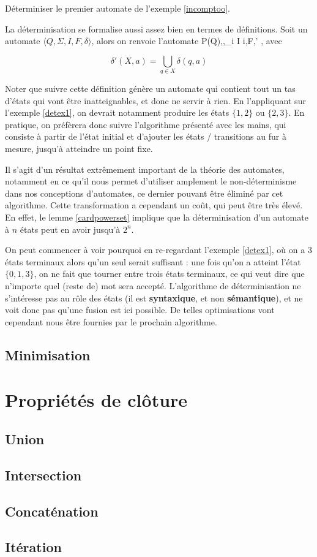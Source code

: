\begin{exercice}
Déterminiser le premier automate de l'exemple \ref{incomptoo}.
\end{exercice}

La déterminisation se formalise aussi assez bien en termes de définitions. Soit un automate $\big \langle Q,\Sigma,I,F,\delta \big \rangle$, alors on renvoie l'automate \big \langle P(Q),\Sigma,\bigcup_{i \in I} i,F,\delta' \big \rangle, avec

\[
\delta'(X,a) = \bigcup_{q \in X} \delta(q,a)
\]

Noter que suivre cette définition génère un automate qui contient tout un tas d'états qui vont être inatteignables, et donc ne servir à rien. En l'appliquant sur l'exemple \ref{detex1}, on devrait notamment produire les états $\{1,2\}$ ou $\{2,3\}$. En pratique, on préfèrera donc suivre l'algorithme présenté avec les mains, qui consiste à partir de l'état initial et d'ajouter les états / transitions au fur à mesure, jusqu'à atteindre un point fixe.

Il s'agit d'un résultat extrêmement important de la théorie des automates, notamment en ce qu'il nous permet d'utiliser amplement le non-déterminisme dans nos conceptions d'automates, ce dernier pouvant être éliminé par cet algorithme. Cette transformation a cependant un coût, qui peut être très élevé. En effet, le lemme \ref{cardpowerset} implique que la déterminisation d'un automate à $n$ états peut en avoir jusqu'à $2^n$.

On peut commencer à voir pourquoi en re-regardant l'exemple \ref{detex1}, où on a 3 états terminaux alors qu'un seul serait suffisant : une fois qu'on a atteint l'état $\{0,1,3\}$, on ne fait que tourner entre trois états terminaux, ce qui veut dire que n'importe quel (reste de) mot sera accepté. L'algorithme de déterminisation ne s'intéresse pas au rôle des états (il est \textbf{syntaxique}, et non \textbf{sémantique}), et ne voit donc pas qu'une fusion est ici possible. De telles optimisations vont cependant nous être fournies par le prochain algorithme.


\subsection{Minimisation}
\label{minim}

\section{Propriétés de clôture}
\label{cloture}
\subsection{Union}

\subsection{Intersection}

\subsection{Concaténation}

\subsection{Itération}

